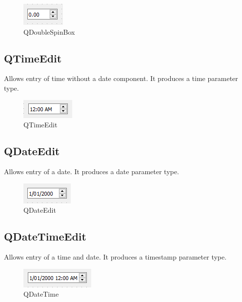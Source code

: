 \documentclass[a4paper,10pt]{book}
\begin{document}
\begin {figure}[!ht]
 \centering
 \includegraphics[scale=1.0]{images/widget/qdoublespinbox}
 \caption{QDoubleSpinBox}
\end {figure}

\subsection{QTimeEdit}

Allows entry of time without a date component. It produces a time parameter type.

\begin {figure}[!ht]
 \centering
 \includegraphics[scale=1.0]{images/widget/qtimeedit}
 \caption{QTimeEdit}
\end {figure}

\subsection{QDateEdit}

Allows entry of a date. It produces a date parameter type.

\begin {figure}[!ht]
 \centering
 \includegraphics[scale=1.0]{images/widget/qdateedit}
 \caption{QDateEdit}
\end {figure}


\subsection{QDateTimeEdit}

Allows entry of a time and date. It produces a timestamp parameter type.

\begin {figure}[!ht]
 \centering
 \includegraphics[scale=1.0]{images/widget/qdatetimeedit}
 \caption{QDateTime}
\end {figure}
\end{document}
